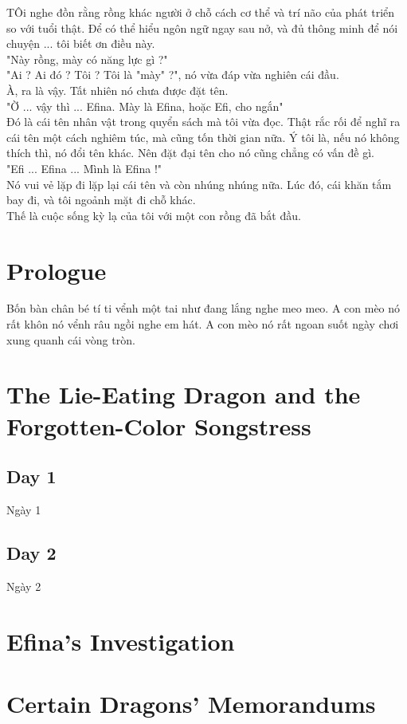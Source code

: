 \documentclass[13pt]{extarticle}
\begin{document}
	TÔi nghe đồn rằng rồng khác người ở chỗ cách cơ thể và trí não của phát triển so với tuổi thật. Để có thể hiểu ngôn ngữ ngay sau nở, và đủ thông minh để nói chuyện ... tôi biết ơn điều này. \\
	
	"Này rồng, mày có năng lực gì ?" \\
	
	"Ai ? Ai đó ? Tôi ? Tôi là "mày"  ?", nó vừa đáp vừa nghiên cái đầu.\\
	
	À, ra là vậy. Tất nhiên nó chưa được đặt tên. \\
	
	"Ờ ... vậy thì ... Efina. Mày là Efina, hoặc Efi, cho ngắn" \\
	
	Đó là cái tên nhân vật trong quyển sách mà tôi vừa đọc. Thật rắc rối để nghĩ ra cái tên một cách nghiêm túc, mà cũng tốn thời gian nữa. Ý tôi là, nếu nó không thích thì, nó đổi tên khác. Nên đặt đại tên cho nó cũng chẳng có vấn đề gì. \\
	
	
	"Efi ... Efina ... Mình là Efina !" \\
	
	Nó vui vẻ lặp đi lặp lại cái tên và còn nhúng nhúng nữa. Lúc đó, cái khăn tắm bay đi, và tôi ngoảnh mặt đi chỗ khác. \\
	
	Thế là cuộc sống kỳ lạ của tôi với một con rồng đã bắt đầu.\\

	
	\section{Prologue}
		Bốn bàn chân bé tí ti 
	vểnh một tai như đang lắng nghe meo meo.
	A con mèo nó rất khôn 
	nó vểnh râu ngồi nghe em hát.
	A con mèo nó rất ngoan 
	suốt ngày chơi xung quanh cái vòng tròn. 
	
	\section{The Lie-Eating Dragon and the Forgotten-Color Songstress}
	
	
	\subsection*{Day 1}
	Ngày 1 
	
	\subsection*{Day 2}
	Ngày 2 
	
	\section{Efina’s Investigation}
	
	\section{Certain Dragons’ Memorandums}
	
	
\end{document}
